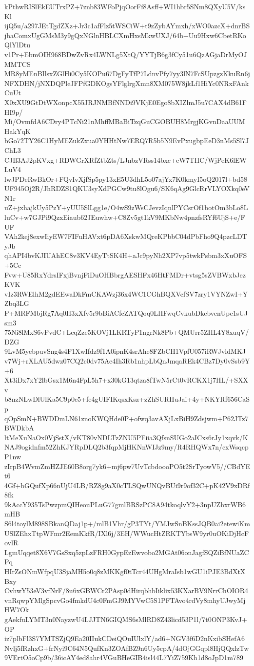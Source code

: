 kPthwRISlEkEUTrxPZ+7znb83WFoPjqOorFf8Asff+WI1hbr5SNm8QXyU5V/ksKl
ijQ5u/a297JEtTgdZXz+Jr3c1afFlz5tWSCiW+t9zZybAYmxh/xWO0azcX+dnrBS
jbaComxUgGMsM3y9gQxNGlnHBLCXmHxsMkwUXJ/64b+Uu9Hxw6CbetRKoQlYlDtu
v1Pr+EbmOIH968BDwZvRx4LWNLg5XtQ/YYTjB6g3fCy51u6QzAGjaDrMyOJMMTCS
MR8yMEnBIlsxZGlHi0Cy5KOPu67DgFyTfP7LdnvPfy7yy3lN7FcSUpzgzKkuRn6j
NFXDHN/jNXDQPleJFPfGDKOgsYFlglrgXmn8XM075W8jkLf1HiYc0NRxFAnkCuUt
X0xXU9GtDtWXonpcX55JRJNMBfNNDi9VKjE0Ego8bXIZlmJ5u7CAX4dB61FHI9p/
Mi/OvmfdA6CDry4PTcNi21nMhffMBaBiTzqGuCGOBUH8MrgjKGvnDaaUUMHakYqK
bGo72TY26C1HyMEZukZxua0YHHtNw7ERQ7R5b5N9EvPxugbpEeD3nMs5Sl7JChL3
CJIl3AJ2pKVxg+RDWGrXRfZtbZts/LJnbzVRss14bxc+cW7THC/WjPeK6lEWLuV4
lwJPDeRwBkOr+FQvIvXjfSp5py13xE5U3dhL5o07ajYx7K0kmyI5oQ2017l+bd58
UF945Oj2R/JhRDZS1QKU3syXdPGCw9tu8lOgu6/SK6qAg9GlcRrVLYOXkq0eVN1r
uZ+jxhajkUy5PzY+yUU5SlLgg1e/O4wS9zWsCJevzIqnlPYCsrOf1botOm3bLo8L
luCv+w7GJPi9QzxEiaub62JEuwhw+C8Zv5gt1kV9MKbNw4pnzfsRYf6UjS+e/FUF
VAh2kej8exwIiyEW7FIFuHAVxt6pDA6XskwMQreKPbbC04dPbFho9Q4pzcLDTyJb
qhAPI4bvKJIUAhEC8v3KV4EyTtSK4H+aJc9pyNh2XP7vp5twkPsbm3xXuOFS+5Cc
Fvw+U85RxYdrsIFxjBvnjFiDuOHBbrgAESHFx46HtFMDr+vtsg5sZVBWxbJezKVK
vIz3RWElhM2gdEEwaDkFmCKAWzj36x4WC1CGhBQXVcfSV7zry1VYNZwI+YZbq3LG
P+MRFMbjRg7Aq0H3xXfv5r9bBiACfcZATQoq0LHFwqCvkubDkcbvcnUpc1sUJsm3
75Ni8lMxS6vPvdC+LcqZze5KOVj1LKRTyP1ngrNk8Pb+QMUrr5ZHL4Y8xuqV/DZG
9LvM5yebpuvSng4s4F1XwIfdz9f1A0ipnK4srAhe8FZbCH1VpfU057iRWJvldMKJ
v7Wj+rXLAU5dwz07CQ2c0dv75Ae4Ih3Rb1nhpLbQnJmqaREk4CBz7Dy0vSsb9Y+6
Xt3iDx7xY2lbGsx1M6n4FpL5h7+x30kG13qtza8fTwN5rCt0vRCKX1j7HL/+SXXv
b8nzNLwDlUlKa5C9p0e5+fe4gUIFIKqsxKsz+zZhSURHuJai+4y+NKYRf656CaSp
qOpSmN+BWDDmLN61znoKWQHde0P+ofwq3avAXjLxBiH9Zdsjwm+P62JTz7BWDkbA
ltMeXuNaOx0VjSstX/vKT80vNDLTzZNU5PFiia3QfsnSUGo2aICxs6rJy1xqvk/K
NAJ9ogidnfm52ZhKJYRpDLQ2b3fqpMjHKNnWIJz9my/R4RHQWx7n/cxWsqcpP1nw
zIrpB4WvmZmHZJE60B8org7yk6+mj6pw7UvTcbdoooPO5t2SrTyowV5//CBdYEt6
4Gf+bGQufXp66nUjU4LB/RZ8g9aX0cTLSQwUNQvBUi9r9of32C+pK42V9xDRf8fk
9kAccY935TsPwzpmQIHeouPLuG77gmlBRSzPC8A94tkoqlvY2+3npUZhxrWB6mHB
S6l4toylM898SBkanQDaj1p+/mlB1Vhr/gP3TYt/YMJwSnBKssJQB0ai2etewiKm
USlZEhxTtpWFmr2EemKkfR/IXl6j/3EH/WWucHtZRKTYbsW9yr0uOKiDjHcFovlR
LgmUqqet8X6V7GsSxq5zpLzFRH0GypEzEwvobo2MGAt06onJagfSQZiBfNUaZCPq
HIrZsONmWfpqU3SjaMH5o0q8zMKKgf0tTcr44UHgMraIsb1wGU1iPJE3BdXtXBxy
CvhwY53eV3vfNrF/8u6xGBWCr2PAsp0dHirqbhbIiklix53KXarBV9NrrChOIOR4
vnRqwpYMlgSpcvGo4fmkdU4c0FmGJ9MYVwC5S1PFTAvo4rdVy8mhyUJwyMjHW7Ok
gAekfuLYMT3n0NayzwU4LJJTN6GIQMS6sMlRD8Z43licd53P1l/7t0ONP3KvJ+OP
iz7plbFl3S7YMTSZjQ9Ea20IIukCDeiQOuIUlxlY/ad6+NGV3f6D2nKxibSHefA6
Nvlj5fRzhxG+frNyi9C64N5QufKn3ZOAfBZ9n6Uy5cpA/4dOjGGqpl8HjQQxlzTw
9VErtO5oCp9b/36icAY4ed8ahr4VGuBHeGIB4isl44L7YiZ759Kh1d8oJpD1m789
